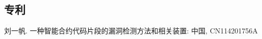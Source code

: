 
\begin{resume}




  \subsection*{专利}

  \begin{achievements}
    \item  刘一帆. 一种智能合约代码片段的漏洞检测方法和相关装置: 中国, CN114201756A
  \end{achievements}

\end{resume}
